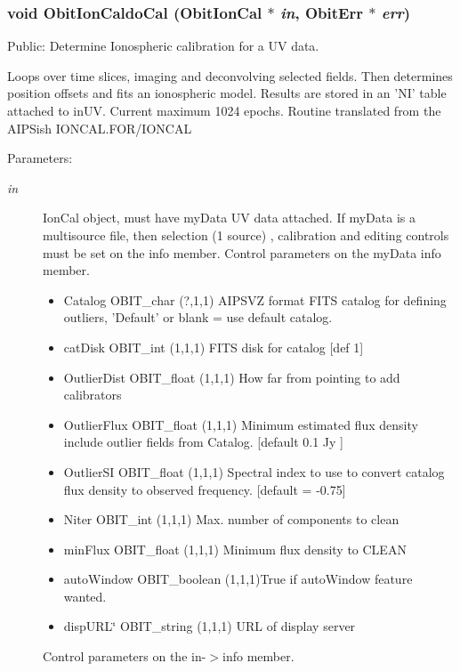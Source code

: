 \subsubsection{\setlength{\rightskip}{0pt plus 5cm}void Obit\-Ion\-Caldo\-Cal ({\bf Obit\-Ion\-Cal} $\ast$ {\em in}, {\bf Obit\-Err} $\ast$ {\em err})}\label{ObitIonCal_8c_a49}


Public: Determine Ionospheric calibration for a UV data. 

Loops over time slices, imaging and deconvolving selected fields. Then determines position offsets and fits an ionospheric model. Results are stored in an 'NI' table attached to in\-UV. Current maximum 1024 epochs. Routine translated from the AIPSish IONCAL.FOR/IONCAL \begin{Desc}
\item[Parameters:]
\begin{description}
\item[{\em in}]Ion\-Cal object, must have my\-Data UV data attached. If my\-Data is a multisource file, then selection (1 source) , calibration and editing controls must be set on the info member. Control parameters on the my\-Data info member. \begin{itemize}
\item Catalog OBIT\_\-char (?,1,1) AIPSVZ format FITS catalog for defining outliers, 'Default' or blank = use default catalog. \item cat\-Disk OBIT\_\-int (1,1,1) FITS disk for catalog [def 1] \item Outlier\-Dist OBIT\_\-float (1,1,1) How far from pointing to add calibrators \item Outlier\-Flux OBIT\_\-float (1,1,1) Minimum estimated flux density include outlier fields from Catalog. [default 0.1 Jy ] \item Outlier\-SI OBIT\_\-float (1,1,1) Spectral index to use to convert catalog flux density to observed frequency. [default = -0.75] \item Niter OBIT\_\-int (1,1,1) Max. number of components to clean \item min\-Flux OBIT\_\-float (1,1,1) Minimum flux density to CLEAN \item auto\-Window OBIT\_\-boolean (1,1,1)True if auto\-Window feature wanted. \item disp\-URL\char`\"{} OBIT\_\-string (1,1,1) URL of display server\end{itemize}
Control parameters on the in-$>$info member. \begin{itemize}

\end{itemize}
\end{description}
\end{Desc}
